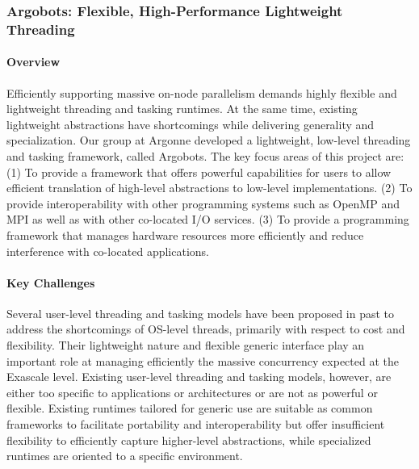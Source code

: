 \subsubsection{Argobots: Flexible, High-Performance Lightweight Threading }

\paragraph{Overview}

Efficiently supporting massive on-node parallelism demands highly
flexible and lightweight threading and tasking runtimes. At the
same time, existing lightweight abstractions have shortcomings while
delivering generality and specialization.  Our group at Argonne
developed a lightweight, low-level threading and tasking framework,
called Argobots.  The key focus areas of this project are: (1) To
provide a framework that offers powerful capabilities for users to
allow efficient translation of high-level abstractions to low-level
implementations. (2) To provide interoperability with other
programming systems such as OpenMP and MPI as well as with other
co-located I/O services. (3) To provide a programming framework that
manages hardware resources more efficiently and reduce interference
with co-located applications.

\paragraph{Key Challenges}

Several user-level threading and tasking models have been proposed in
past to address the shortcomings of OS-level threads, primarily with
respect to cost and flexibility. Their lightweight nature and flexible
generic interface play an important role at managing efficiently the
massive concurrency expected at the Exascale level.  Existing
user-level threading and tasking models, however, are either too
specific to applications or architectures or are not as powerful or
flexible. Existing runtimes tailored for generic use \cite{GNUPth,
  PLDI97_Taura, COSET05_Thibault, COB14_Nakashima, MTAAP08_Wheeler,
  PPoPP99_Taura, SenSys06_Dunkels, TBB1, EuroPar08_Perache} are
suitable as common frameworks to facilitate portability and
interoperability but offer insufficient flexibility to efficiently
capture higher-level abstractions, while specialized runtimes
\cite{ATC02_Adya, SolarisThreads, SOSP03_von_Behren, StateThreads,
  PLDI07_Li, MTAAP09_Porterfield, WMPP05_Cuvillo, IntelOMP, Nanos++,
  LCPC96_Kale, PACT14_Treichler} are oriented to a specific
environment.

